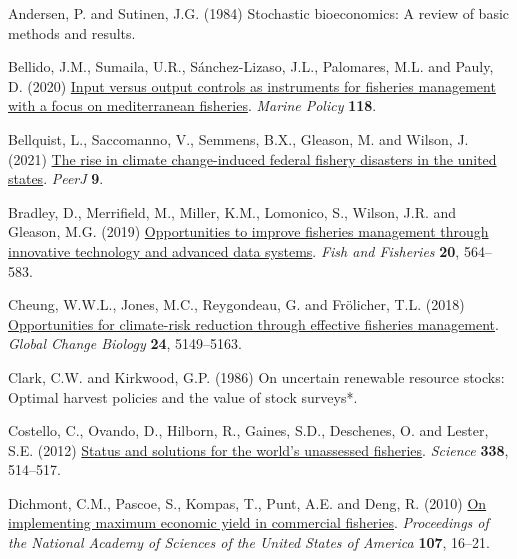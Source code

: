 \documentclass[
  letterpaper,
  DIV=11,
  numbers=noendperiod]{scrartcl}
\newlength{\cslhangindent}
\newlength{\cslentryspacingunit} %
\newenvironment{CSLReferences}[2] %
 {%
  \setlength{\parindent}{0pt}
  \ifodd #1
  \let\oldpar\par
  \def\par{\hangindent=\cslhangindent\oldpar}
  \fi
  \setlength{\parskip}{#2\cslentryspacingunit}
 }%
 {}
\begin{document}
\hypertarget{refs}{}
\begin{CSLReferences}{1}{0}
\leavevmode{}%
Andersen, P. and Sutinen, J.G. (1984) Stochastic bioeconomics: A review
of basic methods and results.

\leavevmode{}%
Bellido, J.M., Sumaila, U.R., Sánchez-Lizaso, J.L., Palomares, M.L. and
Pauly, D. (2020)
\href{https://doi.org/10.1016/J.MARPOL.2019.103786}{Input versus output
controls as instruments for fisheries management with a focus on
mediterranean fisheries}. \emph{Marine Policy} \textbf{118}.

\leavevmode{}%
Bellquist, L., Saccomanno, V., Semmens, B.X., Gleason, M. and Wilson, J.
(2021) \href{https://doi.org/10.7717/peerj.11186}{The rise in climate
change-induced federal fishery disasters in the united states}.
\emph{PeerJ} \textbf{9}.

\leavevmode{}%
Bradley, D., Merrifield, M., Miller, K.M., Lomonico, S., Wilson, J.R.
and Gleason, M.G. (2019)
\href{https://doi.org/10.1111/faf.12361}{Opportunities to improve
fisheries management through innovative technology and advanced data
systems}. \emph{Fish and Fisheries} \textbf{20}, 564--583.

\leavevmode{}%
Cheung, W.W.L., Jones, M.C., Reygondeau, G. and Frölicher, T.L. (2018)
\href{https://doi.org/10.1111/gcb.14390}{Opportunities for climate-risk
reduction through effective fisheries management}. \emph{Global Change
Biology} \textbf{24}, 5149--5163.

\leavevmode{}%
Clark, C.W. and Kirkwood, G.P. (1986) On uncertain renewable resource
stocks: Optimal harvest policies and the value of stock surveys*.

\leavevmode{}%
Costello, C., Ovando, D., Hilborn, R., Gaines, S.D., Deschenes, O. and
Lester, S.E. (2012)
\href{https://doi.org/10.1126/science.1227123}{Status and solutions for
the world's unassessed fisheries}. \emph{Science} \textbf{338},
514--517.

\leavevmode{}%
Dichmont, C.M., Pascoe, S., Kompas, T., Punt, A.E. and Deng, R. (2010)
\href{https://doi.org/10.1073/pnas.0912091107}{On implementing maximum
economic yield in commercial fisheries}. \emph{Proceedings of the
National Academy of Sciences of the United States of America}
\textbf{107}, 16--21.


\end{CSLReferences}
\end{document}
